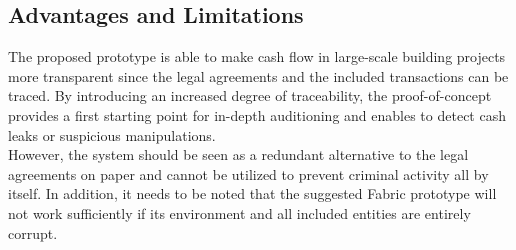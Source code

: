 \subsection{Advantages and Limitations} \label{evaluation}
The proposed prototype is able to make cash flow in large-scale building projects more transparent since the legal agreements and the included transactions can be traced. By introducing an increased degree of traceability, the proof-of-concept provides a first starting point for in-depth auditioning and enables to detect cash leaks or suspicious manipulations. \\
However, the system should be seen as a redundant alternative to the legal agreements on paper and cannot be utilized to prevent criminal activity all by itself. In addition, it needs to be noted that the suggested Fabric prototype will not work sufficiently if its environment and all included entities are entirely corrupt. 
